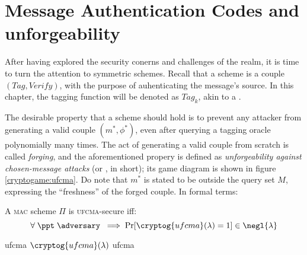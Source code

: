 
\section{Message Authentication Codes and unforgeability}

After having explored the security conerns and challenges of the \ske{} realm, it is time to turn the attention to symmetric \mac{} schemes. Recall that a \mac{} scheme is a couple $(\textit{Tag}, \textit{Verify})$, with the purpose of auhenticating the message's source. In this chapter, the tagging function will be denoted as $\textit{Tag}_k$, akin to a \prf.

The desirable property that a \mac{} scheme should hold is to prevent any attacker from generating a valid couple $(m^*, \phi^*)$, even after querying a tagging oracle polynomially many times\footnotemark.
The act of generating a valid couple from scratch is called \emph{forging}, and the aforementioned propery is defined as \emph{unforgeability against chosen-message attacks} (or \ufcma, in short); its game diagram is shown in figure \ref{cryptogame:ufcma}. Do note that $m^*$ is stated to be outside the query set $M$, expressing the ``freshness'' of the forged couple\footnotemark. In formal terms:


\begin{definition}
    A \textsc{mac} scheme $\Pi$ is \textsc{ufcma}-secure iff:
    \[
        \forall\; \ppt\; \adversary\; \implies \Pr[\cryptog{ufcma}(\lambda) = 1] \in \negl{\lambda}  
    \]
\end{definition}

\begin{cryptogame}
    {ufcma}
    {$\cryptog{ufcma}(\lambda)$}
    {ufcma}


    \cseqbeginloop
    \cseqendloop
    
    \cseqdelay

    
\end{cryptogame}

